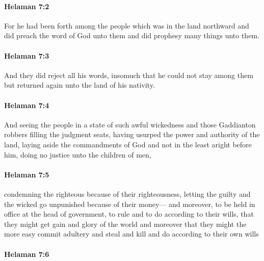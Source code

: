 		\paragraph{Helaman 7:2} %
			\label{HELAMAN-7-2}

			For he had been forth among the people
			which was in the land northward
			and did preach the word of God unto them
			and did prophesy many things unto them.

		\paragraph{Helaman 7:3} %
			\label{HELAMAN-7-3}

			And they did reject all his words,
			insomuch that he could not stay among them
			but returned again unto the land of his nativity.

		\paragraph{Helaman 7:4} %
			\label{HELAMAN-7-4}

			And seeing the people in a state of such awful wickedness
			and those Gaddianton robbers filling the judgment seats,
			having usurped the power and authority of the land,
			laying aside the commandments of God
			and not in the least aright before him,
			doing no justice unto the children of men,

		\paragraph{Helaman 7:5} %
			\label{HELAMAN-7-5}

			condemning the righteous because of their righteousness,
			letting the guilty and the wicked go unpunished because of their money---
			and moreover, to be held in office at the head of government,
			to rule and to do according to their wills,
			that they might get gain and glory of the world
			and moreover that they might the more easy commit adultery
			and steal and kill and do according to their own wills

		\paragraph{Helaman 7:6} %
			\label{HELAMAN-7-6}

